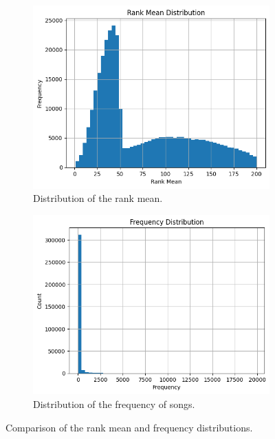 \begin{figure}[h]
    \centering
    \begin{subfigure}[b]{0.45\textwidth}
        \centering
        \includegraphics[width=\textwidth]{media/rank_distpng.png}
        \caption{Distribution of the rank mean.}
        \label{rank_mean_distribution}
    \end{subfigure}
    \hfill
    \begin{subfigure}[b]{0.45\textwidth}
        \centering
        \includegraphics[width=\textwidth]{media/freq_dist.png}
        \caption{Distribution of the frequency of songs.}
        \label{frequency_distribution}
    \end{subfigure}
    \caption{Comparison of the rank mean and frequency distributions.}
    \label{fig:rank_and_frequency}
\end{figure}

